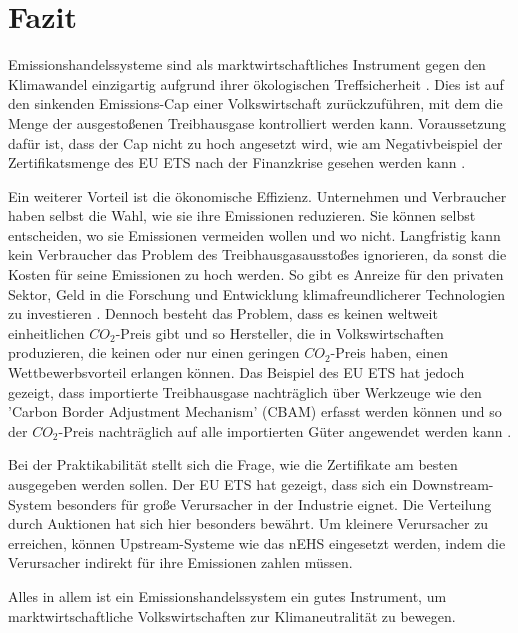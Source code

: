 \chapter{Fazit}

Emissionshandelssysteme sind als marktwirtschaftliches Instrument gegen den Klimawandel einzigartig aufgrund ihrer ökologischen Treffsicherheit \cite[S. 182]{hubert.2020}.
Dies ist auf den sinkenden Emissions-Cap einer Volkswirtschaft zurückzuführen, mit dem die Menge der ausgestoßenen Treibhausgase kontrolliert werden kann.
Voraussetzung dafür ist, dass der Cap nicht zu hoch angesetzt wird, wie am Negativbeispiel der Zertifikatsmenge des EU ETS nach der Finanzkrise gesehen werden kann \cite{eu3.2023}.

Ein weiterer Vorteil ist die ökonomische Effizienz. Unternehmen und Verbraucher haben selbst die Wahl, wie sie ihre Emissionen reduzieren.
Sie können selbst entscheiden, wo sie Emissionen vermeiden wollen und wo nicht. Langfristig kann kein Verbraucher das Problem des Treibhausgasausstoßes ignorieren, da sonst die Kosten für seine Emissionen zu hoch werden.
So gibt es Anreize für den privaten Sektor, Geld in die Forschung und Entwicklung klimafreundlicherer Technologien zu investieren \cite[S. 183]{hubert.2020}.
Dennoch besteht das Problem, dass es keinen weltweit einheitlichen $CO_2$-Preis gibt und so Hersteller, die in Volkswirtschaften produzieren, die keinen oder nur einen geringen $CO_2$-Preis haben, einen Wettbewerbsvorteil erlangen können.
Das Beispiel des EU ETS hat jedoch gezeigt, dass importierte Treibhausgase nachträglich über Werkzeuge wie den 'Carbon Border Adjustment Mechanism' (CBAM) erfasst werden können und so der $CO_2$-Preis nachträglich auf alle importierten Güter angewendet werden kann \cite{ub.2023}.

Bei der Praktikabilität stellt sich die Frage, wie die Zertifikate am besten ausgegeben werden sollen. Der EU ETS hat gezeigt, dass sich ein Downstream-System besonders für große Verursacher in der Industrie eignet.
Die Verteilung durch Auktionen hat sich hier besonders bewährt. Um kleinere Verursacher zu erreichen, können Upstream-Systeme wie das nEHS eingesetzt werden, indem die Verursacher indirekt für ihre Emissionen zahlen müssen.

Alles in allem ist ein Emissionshandelssystem ein gutes Instrument, um marktwirtschaftliche Volkswirtschaften zur Klimaneutralität zu bewegen.